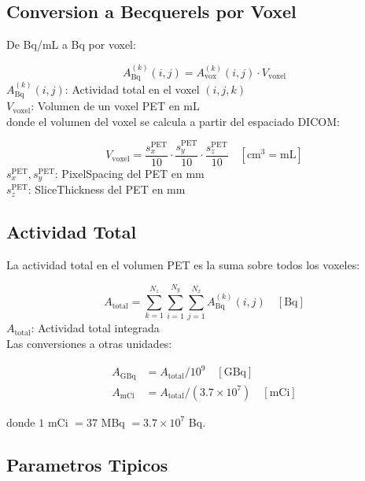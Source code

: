 \documentclass[12pt,a4paper]{article}
\newcommand{\vardef}[2]{\noindent\textbf{#1}: #2\\}
\begin{document}
\subsection{Conversion a Becquerels por Voxel}

De Bq/mL a Bq por voxel:

\begin{equation}\label{eq:bq_por_voxel}
    A_{\text{Bq}}^{(k)}(i,j) = A_{\text{vox}}^{(k)}(i,j) \cdot V_{\text{voxel}}
\end{equation}
\vardef{$A_{\text{Bq}}^{(k)}(i,j)$}{Actividad total en el voxel $(i,j,k)$}
\vardef{$V_{\text{voxel}}$}{Volumen de un voxel PET en mL}

donde el volumen del voxel se calcula a partir del espaciado DICOM:

\begin{equation}\label{eq:vol_voxel}
    V_{\text{voxel}} = \frac{s_x^{\text{PET}}}{10} \cdot
    \frac{s_y^{\text{PET}}}{10} \cdot
    \frac{s_z^{\text{PET}}}{10} \quad [\text{cm}^3 = \text{mL}]
\end{equation}
\vardef{$s_x^{\text{PET}}, s_y^{\text{PET}}$}{PixelSpacing del PET en mm}
\vardef{$s_z^{\text{PET}}$}{SliceThickness del PET en mm}

\subsection{Actividad Total}

La actividad total en el volumen PET es la suma sobre todos los voxeles:

\begin{equation}\label{eq:act_total}
    A_{\text{total}} = \sum_{k=1}^{N_z} \sum_{i=1}^{N_y} \sum_{j=1}^{N_x}
    A_{\text{Bq}}^{(k)}(i,j) \quad [\text{Bq}]
\end{equation}
\vardef{$A_{\text{total}}$}{Actividad total integrada}

Las conversiones a otras unidades:

\begin{align}
    A_{\text{GBq}} &= A_{\text{total}} / 10^9 \quad [\text{GBq}] \\
    A_{\text{mCi}} &= A_{\text{total}} / (3.7 \times 10^7) \quad [\text{mCi}]
\end{align}

donde $1$ mCi $= 37$ MBq $= 3.7 \times 10^7$ Bq.

\subsection{Parametros Tipicos}
\end{document}
